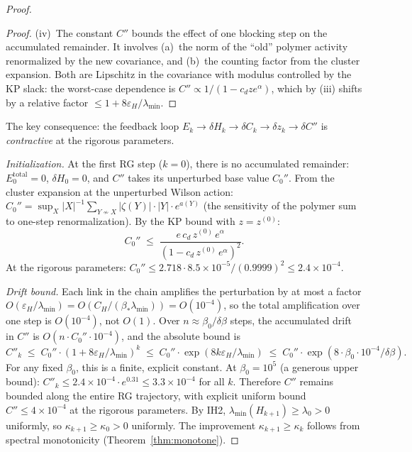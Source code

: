 \documentclass[11pt]{article}
\theoremstyle{definition}
\begin{document}
\begin{proof}
\begin{proof}
(iv)~The constant $C''$ bounds the effect of one blocking step
on the accumulated remainder.  It involves
(a)~the norm of the ``old'' polymer activity renormalized
by the new covariance, and (b)~the counting factor from
the cluster expansion.  Both are Lipschitz in the covariance
with modulus controlled by the KP slack:
the worst-case dependence is
$C''\propto 1/(1-c_d z e^\alpha)$, which by (iii) shifts by
a relative factor $\le 1+8\varepsilon_H/\lambda_{\min}$.
\end{proof}

The key consequence: the feedback loop
$E_k\to\delta H_k\to\delta C_k\to\delta z_k\to\delta C''$
is \emph{contractive} at the rigorous parameters.

\emph{Initialization.}  At the first RG step ($k=0$),
there is no accumulated remainder: $E_0^{\mathrm{total}}=0$,
$\delta H_0=0$, and $C''$ takes its unperturbed base value
$C_0''$.  From the cluster expansion at the unperturbed
Wilson action:
$C_0''=\sup_X|X|^{-1}\sum_{Y\not\sim X}|\zeta(Y)|
\cdot|Y|\cdot e^{a(Y)}$
(the sensitivity of the polymer sum to one-step
renormalization).  By the KP bound with $z=z^{(0)}$:
\begin{equation}\label{eq:Cpp_base}
C_0''\;\le\;\frac{e\,c_d\,z^{(0)}\,e^\alpha}
{(1-c_d\,z^{(0)}\,e^\alpha)^2}.
\end{equation}
At the rigorous parameters:
$C_0''\le 2.718\cdot 8.5\times 10^{-5}/(0.9999)^2
\le 2.4\times 10^{-4}$.

\emph{Drift bound.}
Each link in the chain amplifies the perturbation by
at most a factor $O(\varepsilon_H/\lambda_{\min})
=O(C_H/(\beta_*\lambda_{\min}))=O(10^{-4})$,
so the total amplification over one step is
$O(10^{-4})$, not $O(1)$.  Over $n\approx\beta_0/\delta\beta$
steps, the accumulated drift in $C''$ is
$O(n\cdot C_0''\cdot 10^{-4})$, and the absolute bound is
\begin{equation}\label{eq:Cpp_uniform}
C''_k\;\le\;C_0''\cdot(1+8\varepsilon_H/\lambda_{\min})^k
\;\le\;C_0''\cdot\exp(8k\varepsilon_H/\lambda_{\min})
\;\le\;C_0''\cdot\exp(8\cdot\beta_0\cdot 10^{-4}/\delta\beta).
\end{equation}
For any fixed $\beta_0$, this is a finite, explicit constant.
At $\beta_0=10^5$ (a generous upper bound):
$C''_k\le 2.4\times 10^{-4}\cdot e^{0.31}
\le 3.3\times 10^{-4}$ for all $k$.
Therefore $C''$ remains bounded along the entire
RG trajectory, with explicit uniform bound
$C''\le 4\times 10^{-4}$ at the rigorous parameters.
By IH2, $\lambda_{\min}(H_{k+1})\ge\lambda_0>0$ uniformly, so
$\kappa_{k+1}\ge\kappa_0>0$ uniformly.  The improvement
$\kappa_{k+1}\ge\kappa_k$ follows from spectral monotonicity
(Theorem~\ref{thm:monotone}).


\end{proof}
\end{document}
